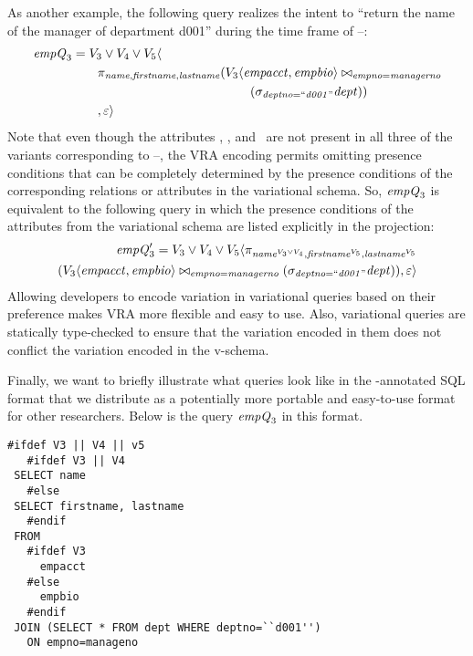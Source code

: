 As another example, the following query realizes the intent to ``return the
name of the manager of department d001'' during the time frame of
\vThree--\vFive:
%
\begin{align*}
\eq_3 &= \vThree\vee\vFour\vee\vFive \langle\\
&\qquad  \pi_{\name,\fname,\lname} 
({\chc[\vThree]{\empacct,\empbio}}
          \bowtie_{\empno=\managerno}\\
&\qquad \qquad \qquad \qquad \qquad \qquad \qquad {(\vSel[\deptno=\deptOne]{\dept})}
)\\
&\qquad           ,
  \empRel \rangle
\end{align*}
%
\noindent
Note that even though the attributes \name, \fname, and \lname\ are not present
in all three of the variants corresponding to \vThree--\vFive, the VRA encoding
permits omitting presence conditions that can be completely determined by the
presence conditions of the corresponding relations or attributes in the
variational schema. So, $\eq_3$ is equivalent to the following query in which the
presence conditions of the attributes from the variational schema are listed
explicitly in the projection:
%
\begin{align*}
\VVal {\eq_3} = \vThree\vee\vFour\vee\vFive \langle
  \pi_{\oatt{\name}{\vThree\vee\vFour},\oatt{\fname}{\vFive},\oatt{\lname}{\vFive}} 
  \\
  (\joinRel{\chc[\vThree]{\empacct,\empbio}}{(\vSel[\deptno=\deptOne]{\dept})}
           {\empno=\managerno}),
  \empRel \rangle
\end{align*}
%
%
 \noindent
Allowing developers to encode variation in variational queries based on their
preference makes VRA more flexible and easy to use. 
Also, variational queries are statically type-checked to ensure that
the variation encoded in them does not conflict the variation encoded
in the v-schema. 

 Finally, we want to briefly illustrate what queries look like in the
 -annotated SQL format that we distribute as a potentially more
 portable and easy-to-use format for other researchers. Below is the query $\eq_3$
 in this format.
 
 \begin{lstlisting}[language={}]
 #ifdef V3 || V4 || v5
   #ifdef V3 || V4
 SELECT name
   #else
 SELECT firstname, lastname
   #endif
 FROM
   #ifdef V3
     empacct
   #else
     empbio
   #endif
 JOIN (SELECT * FROM dept WHERE deptno=``d001'')
   ON empno=manageno  
 \end{lstlisting}


%
